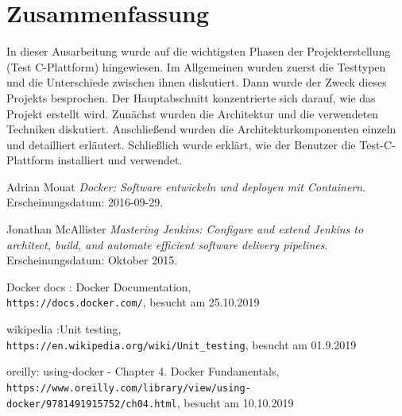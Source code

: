 \documentclass[a4paper,12pt,oneside]{book}
\begin{document}
\chapter{Zusammenfassung}
In dieser Ausarbeitung wurde auf die wichtigsten Phasen der Projekterstellung (Test C-Plattform) hingewiesen. Im Allgemeinen wurden zuerst die Testtypen und die Unterschiede zwischen ihnen diskutiert. Dann wurde der Zweck dieses Projekts besprochen.
\newline
Der Hauptabschnitt konzentrierte sich darauf, wie das Projekt erstellt wird. Zunächst wurden die Architektur und die verwendeten Techniken diskutiert. Anschließend wurden die Architekturkomponenten einzeln und detailliert erläutert.
Schließlich wurde erklärt, wie der Benutzer die Test-C-Plattform installiert und verwendet.
\begin{thebibliography}{9}
Adrian Mouat 
\newline
\textit{Docker: Software entwickeln und deployen mit Containern}. 
\newline
Erscheinungsdatum: 2016-09-29.

Jonathan McAllister 
\newline
\textit{Mastering Jenkins: Configure and extend Jenkins to architect, build, and automate efficient software delivery pipelines}. 
\newline
Erscheinungsdatum: Oktober 2015.

Docker docs : Docker Documentation,
\\\texttt{https://docs.docker.com/}, besucht am 25.10.2019

wikipedia :Unit testing,
\\\texttt{https://en.wikipedia.org/wiki/Unit_testing}, besucht am 01.9.2019	

oreilly: using-docker - Chapter 4. Docker Fundamentals,
\\\texttt{https://www.oreilly.com/library/view/using-docker/9781491915752/ch04.html}, besucht am 10.10.2019	
\end{thebibliography}
\end{document}
